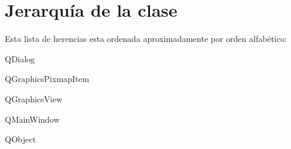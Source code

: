 \section{Jerarquía de la clase}
Esta lista de herencias esta ordenada aproximadamente por orden alfabético\-:\begin{DoxyCompactList}
\item Q\-Dialog\begin{DoxyCompactList}
\item {}
\item {}
\end{DoxyCompactList}
\item Q\-Graphics\-Pixmap\-Item\begin{DoxyCompactList}
\item {}
\item {}
\end{DoxyCompactList}
\item Q\-Graphics\-View\begin{DoxyCompactList}
\item {}
\item {}
\end{DoxyCompactList}
\item Q\-Main\-Window\begin{DoxyCompactList}
\item {}
\end{DoxyCompactList}
\item Q\-Object\begin{DoxyCompactList}
\item {}
\item {}
\end{DoxyCompactList}
\end{DoxyCompactList}
